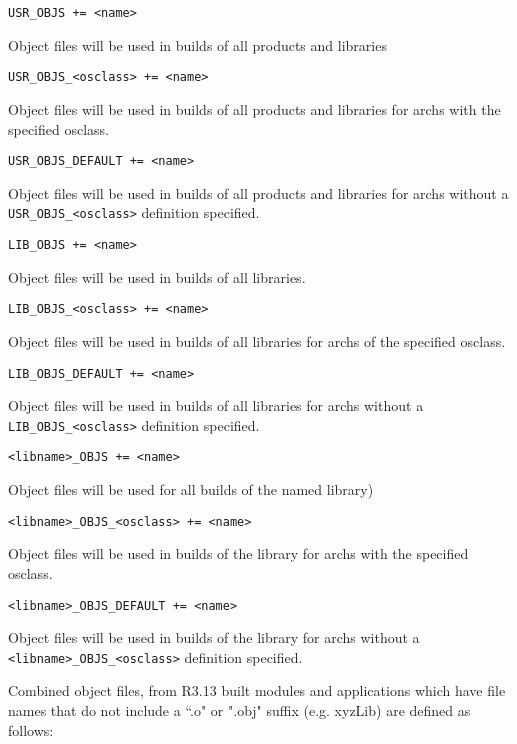 \begin{description}

\item {}\verb|USR_OBJS += <name>|

Object files will be used in builds of all products and libraries

\item \verb|USR_OBJS_<osclass> += <name>|

Object files will be used in builds of all products and libraries for archs with the specified osclass.

\item \verb|USR_OBJS_DEFAULT += <name>|

Object files will be used in builds of all products and libraries for archs without a \verb|USR_OBJS_<osclass>|
definition specified.

\item {}\verb|LIB_OBJS += <name>|

Object files will be used in builds of all libraries.

\item \verb|LIB_OBJS_<osclass> += <name>|

Object files will be used in builds of all libraries for archs of the specified osclass.

\item \verb|LIB_OBJS_DEFAULT += <name>|

Object files will be used in builds of all libraries for archs without a \verb|LIB_OBJS_<osclass>| definition 
specified.

\item {}\verb|<libname>_OBJS += <name>|

Object files will be used for all builds of the named library)

\item \verb|<libname>_OBJS_<osclass> += <name>| 

Object files will be used in builds of the library for archs with the specified osclass.

\item \verb|<libname>_OBJS_DEFAULT += <name>|

Object files will be used in builds of the library for archs without a \verb|<libname>_OBJS_<osclass>| definition 
specified.

\end{description}

Combined object files, from R3.13 built modules and applications which have file names that do not include a ``.o" or ".obj" suffix (e.g. xyzLib) are defined as follows:

